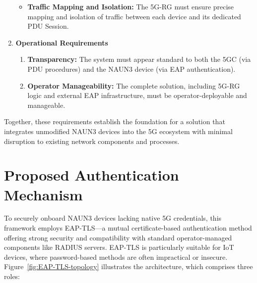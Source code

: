 \begin{enumerate}
{\begin{itemize}
{                \textbf{Lifecycle Management:} The \ac{5G-RG} must manage each device's session from initial authentication to disconnection, including re-authentication and \ac{PDU} Session teardown.
            }
            \item {
                \textbf{Traffic Mapping and Isolation:} The \ac{5G-RG} must ensure precise mapping and isolation of traffic between each device and its dedicated \ac{PDU} Session.
            }
        \end{itemize}
    }
    \item {
        \textbf{Operational Requirements}
        \begin{enumerate}
            \item {
                \textbf{Transparency:} The system must appear standard to both the \ac{5GC} (via \ac{PDU} procedures) and the \ac{NAUN3} device (via \ac{EAP} authentication).
            }
            \item {
                \textbf{Operator Manageability:} The complete solution, including \ac{5G-RG} logic and external \ac{EAP} infrastructure, must be operator-deployable and manageable.
            }
        \end{enumerate}
    }
\end{enumerate}

Together, these requirements establish the foundation for a solution that integrates unmodified \ac{NAUN3} devices into the \ac{5G} ecosystem with minimal disruption to existing network components and processes.


\section{Proposed Authentication Mechanism}

To securely onboard \ac{NAUN3} devices lacking native \ac{5G} credentials, this framework employs \ac{EAP-TLS}—a mutual certificate-based authentication method offering strong security and compatibility with standard operator-managed components like \ac{RADIUS} servers. \ac{EAP-TLS} is particularly suitable for \ac{IoT} devices, where password-based methods are often impractical or insecure. Figure~\ref{fig:EAP-TLS-topology} illustrates the architecture, which comprises three roles:

